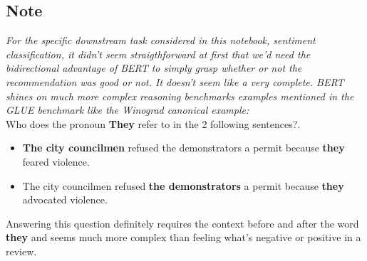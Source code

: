 \documentclass[a4paper]{article}
\begin{document}
\subsection*{Note}
\textit{
For the specific downstream task considered in this notebook, sentiment classification, 
it didn't seem straigthforward at first that we'd need the bidirectional advantage
of BERT to simply grasp whether or not the recommendation was good or not. It doesn't seem like a very complete.
BERT\cite{devlin2019bert} shines on much more complex reasoning benchmarks examples mentioned in the GLUE \cite{wang2019glue} benchmark like
the Winograd canonical example:} \\
Who does the pronoun \textbf{They} refer to in the 2 following sentences?.

\begin{itemize}
\item \textbf{The city councilmen} refused the demonstrators a permit because \textbf{they} feared violence.
\item The city councilmen refused \textbf{the demonstrators} a permit because \textbf{they} advocated violence.
\end{itemize}

Answering this question definitely requires the context before and after the word \textbf{they} and seems much more
complex than feeling what's negative or positive in a review.


\end{document}
